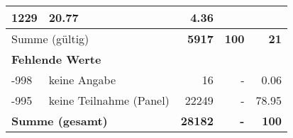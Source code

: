 \begin{longtable}{lXrrr}
       \num{1229} &
       \num[round-mode=places,round-precision=2]{20.77} &
         \num[round-mode=places,round-precision=2]{4.36} \\
     \midrule
     \multicolumn{2}{l}{Summe (gültig)} &
       \textbf{\num{5917}} &
     \textbf{\num{100}} &
       \textbf{\num[round-mode=places,round-precision=2]{21}} \\
     \multicolumn{5}{l}{\textbf{Fehlende Werte}}\\
       -998 &
       keine Angabe &
         \num{16} &
        - &
         \num[round-mode=places,round-precision=2]{0.06} \\
       -995 &
       keine Teilnahme (Panel) &
         \num{22249} &
        - &
         \num[round-mode=places,round-precision=2]{78.95} \\
     \midrule
     \multicolumn{2}{l}{\textbf{Summe (gesamt)}} &
          \textbf{\num{28182}} &
        \textbf{-} &
        \textbf{\num{100}} \\
     \bottomrule
     \end{longtable}
     
